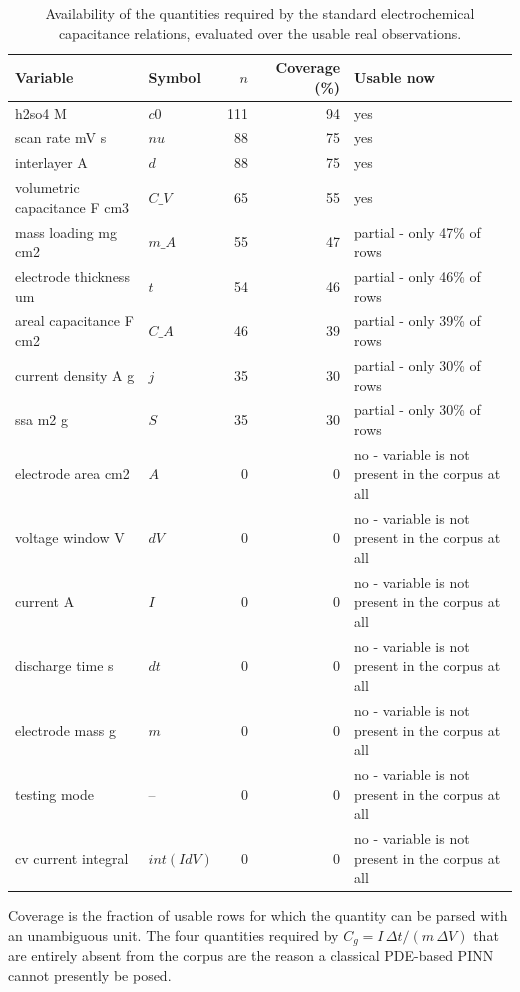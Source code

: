 \begin{table}[htbp]
\centering
\caption{Availability of the quantities required by the standard electrochemical capacitance relations, evaluated over the usable real observations.}
\label{tab:physavail}
\footnotesize
\begin{tabular}{llrrl}
\toprule
\textbf{Variable} & \textbf{Symbol} & \textbf{$n$} & \textbf{Coverage (\%)} & \textbf{Usable now} \\
\midrule
h2so4 M & $c0$ & 111 & 94 & yes \\
scan rate mV s & $nu$ & 88 & 75 & yes \\
interlayer A & $d$ & 88 & 75 & yes \\
volumetric capacitance F cm3 & $C\_V$ & 65 & 55 & yes \\
mass loading mg cm2 & $m\_A$ & 55 & 47 & partial - only 47\% of rows \\
electrode thickness um & $t$ & 54 & 46 & partial - only 46\% of rows \\
areal capacitance F cm2 & $C\_A$ & 46 & 39 & partial - only 39\% of rows \\
current density A g & $j$ & 35 & 30 & partial - only 30\% of rows \\
ssa m2 g & $S$ & 35 & 30 & partial - only 30\% of rows \\
electrode area cm2 & $A$ & 0 & 0 & no - variable is not present in the corpus at all \\
voltage window V & $dV$ & 0 & 0 & no - variable is not present in the corpus at all \\
current A & $I$ & 0 & 0 & no - variable is not present in the corpus at all \\
discharge time s & $dt$ & 0 & 0 & no - variable is not present in the corpus at all \\
electrode mass g & $m$ & 0 & 0 & no - variable is not present in the corpus at all \\
testing mode & -- & 0 & 0 & no - variable is not present in the corpus at all \\
cv current integral & $int(I dV)$ & 0 & 0 & no - variable is not present in the corpus at all \\
\bottomrule
\end{tabular}
\par\vspace{2pt}\begin{minipage}{\linewidth}\scriptsize Coverage is the fraction of usable rows for which the quantity can be parsed with an unambiguous unit. The four quantities required by $C_g = I\,\Delta t/(m\,\Delta V)$ that are entirely absent from the corpus are the reason a classical PDE-based PINN cannot presently be posed.\end{minipage}
\end{table}